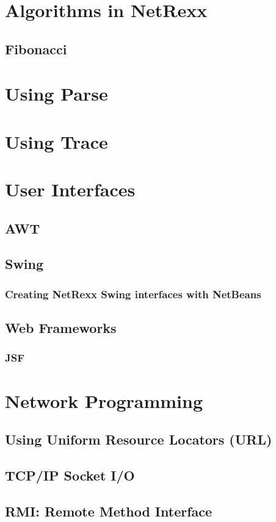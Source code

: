 \documentclass[10pt]{book}
\begin{document}
\chapter{Algorithms in NetRexx}
\section{Fibonacci}

\chapter{Using Parse}
\chapter{Using Trace}

\chapter{User Interfaces}
\section{AWT}
\section{Swing}
\subsection{Creating NetRexx Swing interfaces with NetBeans}
\section{Web Frameworks}
\subsection{JSF}
\chapter{Network Programming}
\section{Using Uniform Resource Locators (URL)}
\section{TCP/IP Socket I/O}
\section{RMI: Remote Method Interface}
\end{document}
